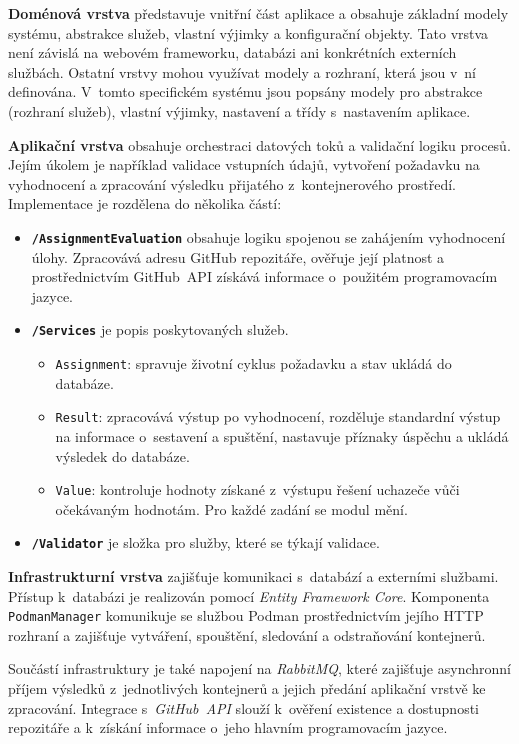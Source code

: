 \documentclass[
  biblatex,
  figures,
  tables,
  glossaries,
  index
]{kidiplom}
\begin{document}
\textbf{Doménová vrstva} představuje vnitřní část aplikace a obsahuje základní modely systému, abstrakce služeb, vlastní výjimky a konfigurační objekty. Tato vrstva není závislá na webovém frameworku, databázi ani konkrétních externích službách. Ostatní vrstvy mohou využívat modely a rozhraní, která jsou v~ní definována. V~tomto specifickém systému jsou popsány modely pro abstrakce (rozhraní služeb), vlastní výjimky, nastavení a třídy s~nastavením aplikace.

\textbf{Aplikační vrstva} obsahuje orchestraci datových toků a validační logiku procesů. Jejím úkolem je například validace vstupních údajů, vytvoření požadavku na vyhodnocení a zpracování výsledku přijatého z~kontejnerového prostředí. Implementace je rozdělena do několika částí:

\begin{itemize}
	\item \textbf{\texttt{/AssignmentEvaluation}} obsahuje logiku spojenou se zahájením vyhodnocení úlohy. Zpracovává adresu GitHub repozitáře, ověřuje její platnost a prostřednictvím GitHub~API získává informace o~použitém programovacím jazyce.
	\item \textbf{\texttt{/Services}} je popis poskytovaných služeb.
	\begin{itemize}
		\item \texttt{Assignment}: spravuje životní cyklus požadavku a stav ukládá do databáze.
		\item \texttt{Result}: zpracovává výstup po vyhodnocení, rozděluje standardní výstup na informace o~sestavení a spuštění, nastavuje příznaky úspěchu a ukládá výsledek do databáze.
		\item \texttt{Value}: kontroluje hodnoty získané z~výstupu řešení uchazeče vůči očekávaným hodnotám. Pro každé zadání se modul mění.
	\end{itemize}
	\item \textbf{\texttt{/Validator}} je složka pro služby, které se týkají validace.
\end{itemize}

\textbf{Infrastrukturní vrstva} zajišťuje komunikaci s~databází a externími službami. Přístup k~databázi je realizován pomocí \textit{Entity Framework Core}. Komponenta \texttt{PodmanManager} komunikuje se službou Podman prostřednictvím jejího HTTP rozhraní a zajišťuje vytváření, spouštění, sledování a odstraňování kontejnerů.

Součástí infrastruktury je také napojení na \textit{RabbitMQ}, které zajišťuje asynchronní příjem výsledků z~jednotlivých kontejnerů a jejich předání aplikační vrstvě ke zpracování. Integrace s~\textit{GitHub~API} slouží k~ověření existence a dostupnosti repozitáře a k~získání informace o~jeho hlavním programovacím jazyce.
\end{document}

